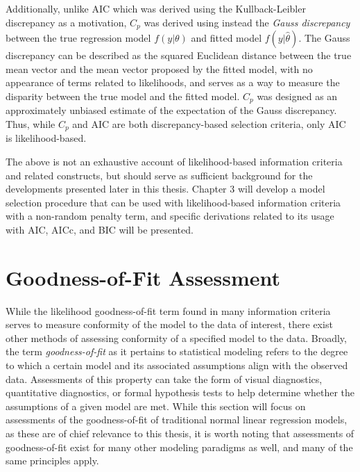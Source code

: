 		Additionally, unlike AIC which was derived using the Kullback-Leibler discrepancy as a motivation, $C_p$ was derived using instead the \textit{Gauss discrepancy} between the true regression model
		$f(y|\theta)$ and fitted model $f(y|\hat{\theta})$. The Gauss discrepancy can be described as the squared Euclidean distance between the true mean vector and the mean vector proposed by the fitted
		model, with no appearance of terms related to likelihoods, and serves as a way to measure the disparity between the true model and the fitted model. $C_p$ was designed as an approximately unbiased
		estimate of the expectation of the Gauss discrepancy. Thus, while $C_p$ and AIC are both discrepancy-based selection criteria, only AIC is likelihood-based.

		The above is not an exhaustive account of likelihood-based information criteria and related constructs, but should serve as sufficient background for the developments presented
		later in this thesis. Chapter 3 will develop a model selection procedure that can be used with likelihood-based information criteria with a non-random penalty term, and specific
		derivations related to its usage with AIC, AICc, and BIC will be presented.
		
		\section{Goodness-of-Fit Assessment}

		While the likelihood goodness-of-fit term found in many information criteria serves to measure conformity of the model to the data of interest, there exist other methods of
		assessing conformity of a specified model to the data. Broadly, the term \textit{goodness-of-fit} as it pertains to statistical modeling refers to the degree to which a certain model
		and its associated assumptions align with the observed data. Assessments of this property can take the form of visual diagnostics, quantitative diagnostics, or formal hypothesis tests to help
		determine whether the assumptions of a given model are met. While this section will focus on assessments of the goodness-of-fit of traditional normal linear regression models, as these are of
		chief relevance to this thesis, it is worth noting that assessments of goodness-of-fit exist for many other modeling paradigms as well, and many of the same principles apply.

